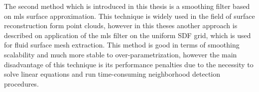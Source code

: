 The second method which is introduced in this thesis is a smoothing filter based on mls surface approximation. This technique is widely used in the field of surface reconstruction form point clouds, however in this theses another approach is described on application of the mls filter on the uniform SDF grid, which is used for fluid surface mesh extraction. This method is good in terms of smoothing scalability and much more stable to over-parametrization, however the main disadvantage of this technique is its performance penalties due to the necessity to solve linear equations and run time-consuming neighborhood detection procedures.